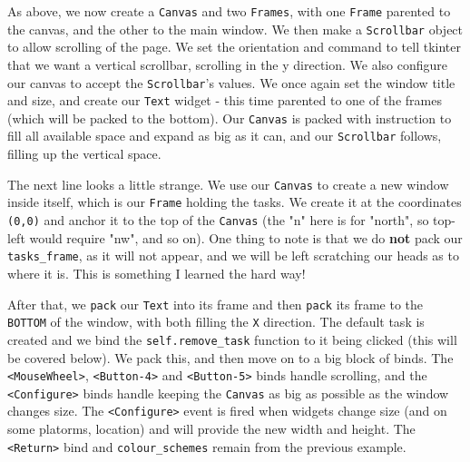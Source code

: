 \documentclass[a4paper,11pt,openany]{book}
\begin{document}
As above, we now create a \lstinline[columns=fixed]{Canvas} and two \lstinline[columns=fixed]{Frames}, with one \lstinline[columns=fixed]{Frame} parented to the canvas, and the other to the main window. We then make a \lstinline[columns=fixed]{Scrollbar} object to allow scrolling of the page. We set the orientation and command to tell tkinter that we want a vertical scrollbar, scrolling in the y direction. We also configure our canvas to accept the \lstinline[columns=fixed]{Scrollbar}'s values. We once again set the window title and size, and create our \lstinline[columns=fixed]{Text} widget - this time parented to one of the frames (which will be packed to the bottom). Our \lstinline[columns=fixed]{Canvas} is packed with instruction to fill all available space and expand as big as it can, and our \lstinline[columns=fixed]{Scrollbar} follows, filling up the vertical space. 

\vspace{5mm}

The next line looks a little strange. We use our \lstinline[columns=fixed]{Canvas} to create a new window inside itself, which is our \lstinline[columns=fixed]{Frame} holding the tasks. We create it at the coordinates \lstinline[columns=fixed]{(0,0)} and anchor it to the top of the \lstinline[columns=fixed]{Canvas} (the "n" here is for "north", so top-left would require "nw", and so on). One thing to note is that we do \textbf{not} pack our \lstinline[columns=fixed]{tasks_frame}, as it will not appear, and we will be left scratching our heads as to where it is. This is something I learned the hard way!

\vspace{5mm}

After that, we \lstinline[columns=fixed]{}\lstinline[columns=fixed]{pack} our \lstinline[columns=fixed]{Text} into its frame and then \lstinline[columns=fixed]{}\lstinline[columns=fixed]{pack} its frame to the \lstinline[columns=fixed]{BOTTOM} of the window, with both filling the \lstinline[columns=fixed]{X} direction. The default task is created and we bind the \lstinline[columns=fixed]{self.remove_task} function to it being clicked (this will be covered below). We pack this, and then move on to a big block of binds. The \lstinline[columns=fixed]{<MouseWheel>}, \lstinline[columns=fixed]{<Button-4>} and \lstinline[columns=fixed]{<Button-5>} binds handle scrolling, and the \lstinline[columns=fixed]{<Configure>} binds handle keeping the \lstinline[columns=fixed]{Canvas} as big as possible as the window changes size. The \lstinline[columns=fixed]{<Configure>} event is fired when widgets change size (and on some platorms, location) and will provide the new width and height. The \lstinline[columns=fixed]{<Return>} bind and \lstinline[columns=fixed]{colour_schemes} remain from the previous example. 
\end{document}
